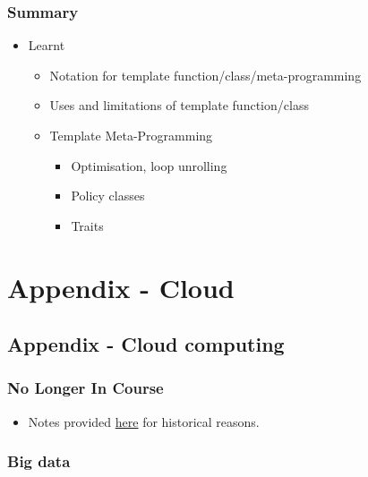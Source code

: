 \subsubsection{Summary}\label{summary-5}

\begin{itemize}
\itemsep1pt\parskip0pt
\item
  Learnt

  \begin{itemize}
  \itemsep1pt\parskip0pt
  \item
    Notation for template function/class/meta-programming
  \item
    Uses and limitations of template function/class
  \item
    Template Meta-Programming

    \begin{itemize}
    \itemsep1pt\parskip0pt
    \item
      Optimisation, loop unrolling
    \item
      Policy classes
    \item
      Traits
    \end{itemize}
  \end{itemize}
\end{itemize}

\section{Appendix - Cloud}\label{appendix---cloud}

\subsection{Appendix - Cloud
computing}\label{appendix---cloud-computing}

\subsubsection{No Longer In Course}\label{no-longer-in-course-1}

\begin{itemize}
\itemsep1pt\parskip0pt
\item
  Notes provided \href{sec01cloud}{here} for historical reasons.
\end{itemize}

\subsubsection{Big data}\label{big-data}

